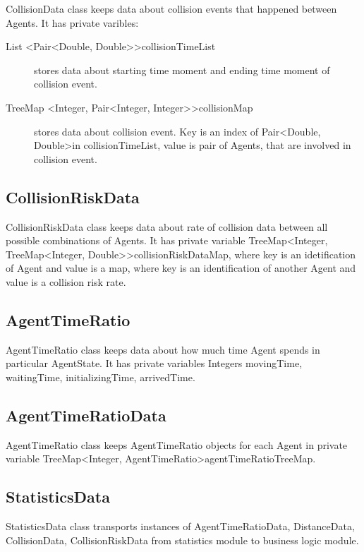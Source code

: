 \documentclass[thesis=B,english]{FITthesis}[2019/12/23]
\begin{document}
CollisionData class keeps data about collision events that happened between Agents.
It has private varibles:  
\begin{description}
\item[List \textless Pair\textless Double, Double\textgreater\textgreater collisionTimeList] stores data about starting time moment and ending time moment of collision event.  
\item[TreeMap \textless Integer, Pair\textless Integer, Integer\textgreater\textgreater collisionMap] stores data about collision event. Key is an index of Pair\textless Double, Double\textgreater in collisionTimeList, value is pair of Agents, that are involved in collision event.
\end{description}

\subsection{CollisionRiskData}

CollisionRiskData class keeps data about rate of collision data between all possible combinations of Agents.  It has private variable TreeMap\textless Integer, TreeMap\textless Integer, Double\textgreater\textgreater collisionRiskDataMap, where key is an idetification of Agent and value is a map, where key is an identification of another Agent and value is a collision risk rate.

\subsection{AgentTimeRatio}

AgentTimeRatio class keeps data about how much time Agent spends in particular AgentState. It has private variables Integers movingTime, waitingTime, initializingTime, arrivedTime.

\subsection{AgentTimeRatioData}

AgentTimeRatio class keeps AgentTimeRatio objects for each Agent in private variable TreeMap\textless Integer, AgentTimeRatio\textgreater agentTimeRatioTreeMap.

\subsection{StatisticsData}

StatisticsData class transports instances of AgentTimeRatioData, DistanceData, CollisionData, CollisionRiskData from statistics module to business logic module.  
\end{document}
